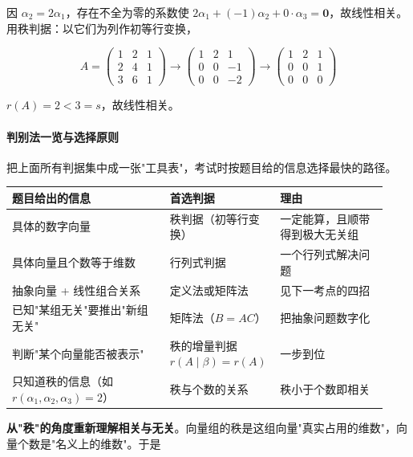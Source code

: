 \documentclass[11pt,openany,UTF8]{ctexbook}
\begin{document}
因 $\alpha_2=2\alpha_1$，存在不全为零的系数使 $2\alpha_1+(-1)\alpha_2+0\cdot\alpha_3=\mathbf{0}$，故线性相关。用秩判据：以它们为列作初等行变换，

\[A=\begin{pmatrix} 1 & 2 & 1 \\ 2 & 4 & 1 \\ 3 & 6 & 1 \end{pmatrix}\to\begin{pmatrix} 1 & 2 & 1 \\ 0 & 0 & -1 \\ 0 & 0 & -2 \end{pmatrix}\to\begin{pmatrix} 1 & 2 & 1 \\ 0 & 0 & 1 \\ 0 & 0 & 0 \end{pmatrix}\]

$r(A)=2<3=s$，故线性相关。

\paragraph{判别法一览与选择原则}\mbox{}{\par}

把上面所有判据集中成一张"工具表"，考试时按题目给的信息选择最快的路径。

\begingroup\small\setlength{\tabcolsep}{4.0pt}
\begin{longtable}{@{}L{0.4121\linewidth}L{0.2347\linewidth}L{0.2817\linewidth}@{}}
\toprule
\textbf{题目给出的信息} & \textbf{首选判据} & \textbf{理由} \\
\midrule
\endhead
具体的数字向量 & 秩判据（初等行变换） & 一定能算，且顺带得到极大无关组 \\
具体向量且个数等于维数 & 行列式判据 & 一个行列式解决问题 \\
抽象向量 + 线性组合关系 & 定义法或矩阵法 & 见下一考点的四招 \\
已知"某组无关"要推出"新组无关" & 矩阵法（$B=AC$） & 把抽象问题数字化 \\
判断"某个向量能否被表示" & 秩的增量判据 $r(A\mid\beta)=r(A)$ & 一步到位 \\
只知道秩的信息（如 $r(\alpha_1,\alpha_2,\alpha_3)=2$） & 秩与个数的关系 & 秩小于个数即相关 \\
\bottomrule
\end{longtable}
\endgroup

\textbf{从"秩"的角度重新理解相关与无关}。向量组的秩是这组向量"真实占用的维数"，向量个数是"名义上的维数"。于是
\end{document}
